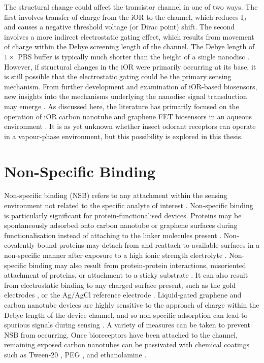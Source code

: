 \documentclass[
  a4paper,
]{scrbook}
\begin{document}
The structural change could affect the transistor channel in one of two
ways. The first involves transfer of charge from the iOR to the channel,
which reduces I\(_{d}\) and causes a negative threshold voltage (or
Dirac point) shift. The second involves a more indirect electrostatic
gating effect, which results from movement of charge within the Debye
screening length of the channel. The Debye length of \(1 \times\) PBS
buffer is typically much shorter than the height of a single nanodisc
\autocite{Murugathas2019a}. However, if structural changes in the iOR
were primarily occurring at its base, it is still possible that the
electrostatic gating could be the primary sensing mechanism. From
further development and examination of iOR-based biosensors, new
insights into the mechanisms underlying the nanodisc signal transduction
may emerge \autocite{Glatz2011}. As discussed here, the literature has
primarily focused on the operation of iOR carbon nanotube and graphene
FET biosensors in an aqueous environment
\autocite{Murugathas2019a,Murugathas2020}. It is as yet unknown whether
insect odorant receptors can operate in a vapour-phase environment, but
this possibility is explored in this thesis.

\hypertarget{sec-non-specific-binding}{%
\section{Non-Specific Binding}\label{sec-non-specific-binding}}

Non-specific binding (NSB) refers to any attachment within the sensing
environment not related to the specific analyte of interest
\autocite{Lichtenberg2019,Shkodra2021}. Non-specific binding is
particularly significant for protein-functionalised devices. Proteins
may be spontaneously adsorbed onto carbon nanotube or graphene surfaces
during functionalisation instead of attaching to the linker molecules
present \autocite{Bradley2004,Star2003a,Chen2004}. Non-covalently bound
proteins may detach from and reattach to available surfaces in a
non-specific manner after exposure to a high ionic strength electrolyte
\autocite{Dung2018}. Non-specific binding may also result from
protein-protein interactions, misoriented attachment of proteins, or
attachment to a sticky substrate \autocite{Chen2004,Lichtenberg2019}. It
can also result from electrostatic binding to any charged surface
present, such as the gold electrodes \autocite{Garcia-Aljaro2010}, or
the Ag/AgCl reference electrode
\autocite{Chen2004,Minot2007,Lichtenberg2019}. Liquid-gated graphene and
carbon nanotube devices are highly sensitive to the approach of charge
within the Debye length of the device channel, and so non-specific
adsorption can lead to spurious signals during sensing
\autocite{Star2003a,Chen2004,Lichtenberg2019,Shkodra2021}. A variety of
measures can be taken to prevent NSB from occurring. Once bioreceptors
have been attached to the channel, remaining exposed carbon nanotubes
can be passivated with chemical coatings such as Tween-20
\autocite{Chen2004}, PEG
\autocite{Star2003a,Lee2012b,Gao2016,Filipiak2018}, and ethanolamine
\autocite{Maehashi2007,Das2011}.
\end{document}
